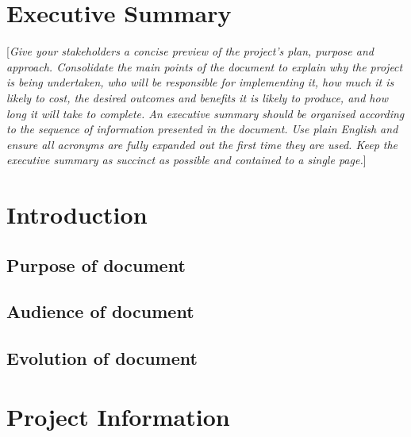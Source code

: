 \documentclass{report}
\begin{document}
\chapter*{Executive Summary}\label{sec:ESummary}
[\textit{Give your stakeholders a concise preview of the project’s plan, purpose and approach. Consolidate the main points of the document to explain why the project is being undertaken, who will be responsible for implementing it, how much it is likely to cost, the desired outcomes and benefits it is likely to produce, and how long it will take to complete. An executive summary should be organised according to the sequence of information presented in the document. Use plain English and ensure all acronyms are fully expanded out the first time they are used. Keep the executive summary as succinct as possible and contained to a single page.}]
\pagebreak
\clearpage

\tableofcontents
\pagebreak

\chapter{Introduction}
\section{Purpose of document}
\section{Audience of document}
\section{Evolution of document}

\chapter{Project Information}
\end{document}
